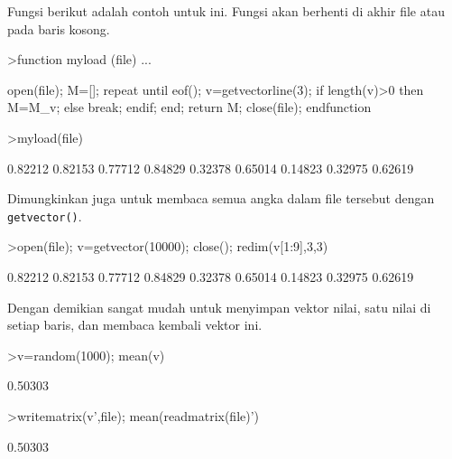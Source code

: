 \documentclass[a4paper,11pt,oneside,enabledeprecatedfontcommands]{scrbook}
\newenvironment{eulernotebook}{}{}
\newenvironment{eulercomment}{\par\medskip\noindent}{\par\medskip}
\begin{document}
\begin{eulernotebook}
\begin{eulercomment}
			Fungsi berikut adalah contoh untuk ini. Fungsi akan berhenti di akhir file atau pada baris kosong.
		\end{eulercomment}
		\begin{eulerprompt}
			>function myload (file) ...
		\end{eulerprompt}
		\begin{eulerudf}
			open(file);
			M=[];
			repeat
			   until eof();
			   v=getvectorline(3);
			   if length(v)>0 then M=M_v; else break; endif;
			end;
			return M;
			close(file);
			endfunction
		\end{eulerudf}
		\begin{eulerprompt}
			>myload(file)
		\end{eulerprompt}
		\begin{euleroutput}
			  0.82212   0.82153   0.77712 
			  0.84829   0.32378   0.65014 
			  0.14823   0.32975   0.62619 
		\end{euleroutput}
		\begin{eulercomment}
			Dimungkinkan juga untuk membaca semua angka dalam file tersebut dengan \texttt{getvector()}.
		\end{eulercomment}
		\begin{eulerprompt}
			>open(file); v=getvector(10000); close(); redim(v[1:9],3,3)
		\end{eulerprompt}
		\begin{euleroutput}
			  0.82212   0.82153   0.77712 
			  0.84829   0.32378   0.65014 
			  0.14823   0.32975   0.62619 
		\end{euleroutput}
		\begin{eulercomment}
			Dengan demikian sangat mudah untuk menyimpan vektor nilai, satu nilai di setiap baris, dan membaca
			kembali vektor ini.
		\end{eulercomment}
		\begin{eulerprompt}
			>v=random(1000); mean(v)
		\end{eulerprompt}
		\begin{euleroutput}
			0.50303
		\end{euleroutput}
		\begin{eulerprompt}
			>writematrix(v',file); mean(readmatrix(file)')
		\end{eulerprompt}
		\begin{euleroutput}
			0.50303
		\end{euleroutput}
		

\end{eulernotebook}
\end{document}
